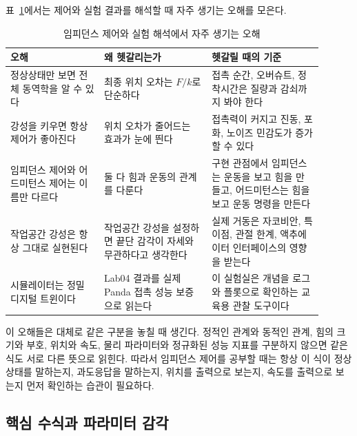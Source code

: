 표~\ref{tab:discussion-control-misunderstandings}에서는 제어와 실험 결과를 해석할 때 자주 생기는 오해를 모은다.
\begin{table}[!htbp]
  \centering
  \caption{임피던스 제어와 실험 해석에서 자주 생기는 오해}
  \label{tab:discussion-control-misunderstandings}
  {\renewcommand{\arraystretch}{1.12}
  \begin{tabular}{p{0.27\linewidth}p{0.31\linewidth}p{0.32\linewidth}}
    \toprule
    오해 & 왜 헷갈리는가 & 헷갈릴 때의 기준 \\
    \midrule
    정상상태만 보면 전체 동역학을 알 수 있다 & 최종 위치 오차는 $F/k$로 단순하다 & 접촉 순간, 오버슈트, 정착시간은 질량과 감쇠까지 봐야 한다 \\
    강성을 키우면 항상 제어가 좋아진다 & 위치 오차가 줄어드는 효과가 눈에 띈다 & 접촉력이 커지고 진동, 포화, 노이즈 민감도가 증가할 수 있다 \\
    임피던스 제어와 어드미턴스 제어는 이름만 다르다 & 둘 다 힘과 운동의 관계를 다룬다 & 구현 관점에서 임피던스는 운동을 보고 힘을 만들고, 어드미턴스는 힘을 보고 운동 명령을 만든다 \\
    작업공간 강성은 항상 그대로 실현된다 & 작업공간 강성을 설정하면 끝단 감각이 자세와 무관하다고 생각한다 & 실제 거동은 자코비안, 특이점, 관절 한계, 액추에이터 인터페이스의 영향을 받는다 \\
    시뮬레이터는 정밀 디지털 트윈이다 & Lab04 결과를 실제 Panda 접촉 성능 보증으로 읽는다 & 이 실험실은 개념을 로그와 플롯으로 확인하는 교육용 관찰 도구이다 \\
    \bottomrule
  \end{tabular}}
\end{table}

이 오해들은 대체로 같은 구분을 놓칠 때 생긴다.
정적인 관계와 동적인 관계, 힘의 크기와 부호, 위치와 속도, 물리 파라미터와 정규화된 성능 지표를 구분하지 않으면 같은 식도 서로 다른 뜻으로 읽힌다.
따라서 임피던스 제어를 공부할 때는 항상 이 식이 정상상태를 말하는지, 과도응답을 말하는지, 위치를 출력으로 보는지, 속도를 출력으로 보는지 먼저 확인하는 습관이 필요하다.

\subsection{핵심 수식과 파라미터 감각}

